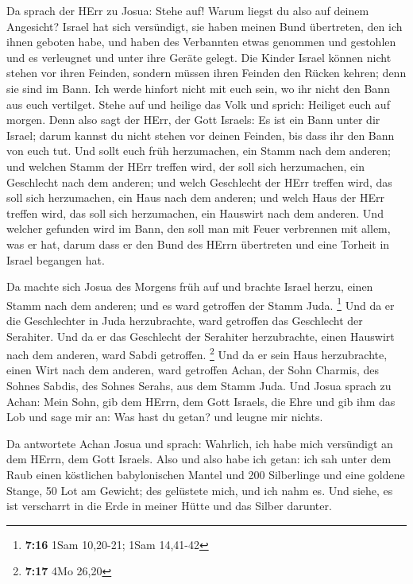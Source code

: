  Da sprach der HErr zu Josua: Stehe auf! Warum liegst du
also auf deinem Angesicht?  Israel hat sich versündigt, sie
haben meinen Bund übertreten, den ich ihnen geboten habe, und haben des
Verbannten etwas genommen und gestohlen und es verleugnet und unter ihre
Geräte gelegt.  Die Kinder Israel können nicht stehen vor
ihren Feinden, sondern müssen ihren Feinden den Rücken kehren; denn sie
sind im Bann. Ich werde hinfort nicht mit euch sein, wo ihr nicht den
Bann aus euch vertilget.  Stehe auf und heilige das Volk
und sprich: Heiliget euch auf morgen. Denn also sagt der HErr, der Gott
Israels: Es ist ein Bann unter dir Israel; darum kannst du nicht stehen
vor deinen Feinden, bis dass ihr den Bann von euch tut. 
Und sollt euch früh herzumachen, ein Stamm nach dem anderen; und welchen
Stamm der HErr treffen wird, der soll sich herzumachen, ein Geschlecht
nach dem anderen; und welch Geschlecht der HErr treffen wird, das soll
sich herzumachen, ein Haus nach dem anderen; und welch Haus der HErr
treffen wird, das soll sich herzumachen, ein Hauswirt nach dem anderen.
 Und welcher gefunden wird im Bann, den soll man mit Feuer
verbrennen mit allem, was er hat, darum dass er den Bund des HErrn
übertreten und eine Torheit in Israel begangen hat.

 Da machte sich Josua des Morgens früh auf und brachte
Israel herzu, einen Stamm nach dem anderen; und es ward getroffen der
Stamm Juda. \footnote{\textbf{7:16} 1Sam 10,20-21; 1Sam 14,41-42}
 Und da er die Geschlechter in Juda herzubrachte, ward
getroffen das Geschlecht der Serahiter. Und da er das Geschlecht der
Serahiter herzubrachte, einen Hauswirt nach dem anderen, ward Sabdi
getroffen. \footnote{\textbf{7:17} 4Mo 26,20}  Und da er
sein Haus herzubrachte, einen Wirt nach dem anderen, ward getroffen
Achan, der Sohn Charmis, des Sohnes Sabdis, des Sohnes Serahs, aus dem
Stamm Juda.  Und Josua sprach zu Achan: Mein Sohn, gib dem
HErrn, dem Gott Israels, die Ehre und gib ihm das Lob und sage mir an:
Was hast du getan? und leugne mir nichts.

 Da antwortete Achan Josua und sprach: Wahrlich, ich habe
mich versündigt an dem HErrn, dem Gott Israels. Also und also habe ich
getan:  ich sah unter dem Raub einen köstlichen
babylonischen Mantel und 200 Silberlinge und eine goldene Stange, 50 Lot
am Gewicht; des gelüstete mich, und ich nahm es. Und siehe, es ist
verscharrt in die Erde in meiner Hütte und das Silber darunter.

